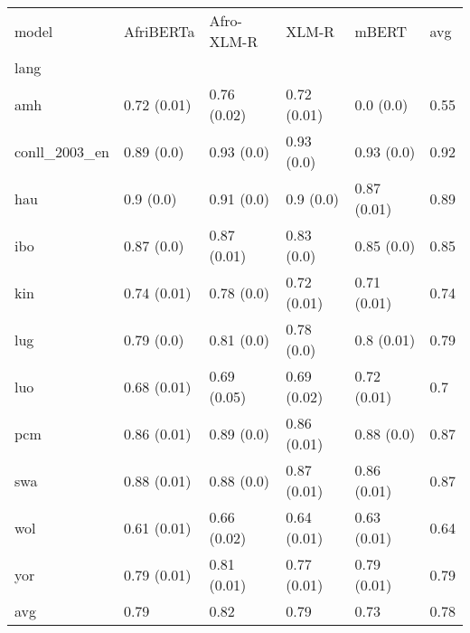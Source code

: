 \begin{tabular}{lllll|l}
\toprule
model &    AfriBERTa &   Afro-XLM-R &        XLM-R &        mBERT &   avg \\
lang          &              &              &              &              &       \\
\midrule
amh           &  0.72 (0.01) &  0.76 (0.02) &  0.72 (0.01) &    0.0 (0.0) &  0.55 \\
conll\_2003\_en &   0.89 (0.0) &   0.93 (0.0) &   0.93 (0.0) &   0.93 (0.0) &  0.92 \\
hau           &    0.9 (0.0) &   0.91 (0.0) &    0.9 (0.0) &  0.87 (0.01) &  0.89 \\
ibo           &   0.87 (0.0) &  0.87 (0.01) &   0.83 (0.0) &   0.85 (0.0) &  0.85 \\
kin           &  0.74 (0.01) &   0.78 (0.0) &  0.72 (0.01) &  0.71 (0.01) &  0.74 \\
lug           &   0.79 (0.0) &   0.81 (0.0) &   0.78 (0.0) &   0.8 (0.01) &  0.79 \\
luo           &  0.68 (0.01) &  0.69 (0.05) &  0.69 (0.02) &  0.72 (0.01) &   0.7 \\
pcm           &  0.86 (0.01) &   0.89 (0.0) &  0.86 (0.01) &   0.88 (0.0) &  0.87 \\
swa           &  0.88 (0.01) &   0.88 (0.0) &  0.87 (0.01) &  0.86 (0.01) &  0.87 \\
wol           &  0.61 (0.01) &  0.66 (0.02) &  0.64 (0.01) &  0.63 (0.01) &  0.64 \\
yor           &  0.79 (0.01) &  0.81 (0.01) &  0.77 (0.01) &  0.79 (0.01) &  0.79 \\
\midrule
avg           &         0.79 &         0.82 &         0.79 &         0.73 &  0.78 \\
\bottomrule
\end{tabular}
